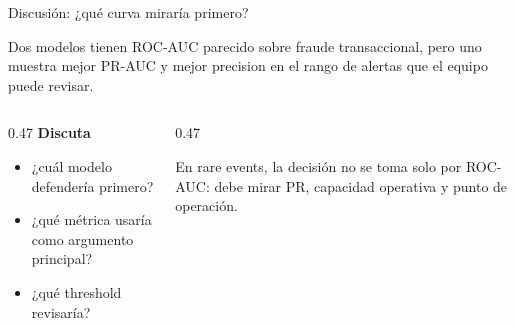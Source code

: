 \documentclass[aspectratio=169,12pt]{beamer}
\newcommand{\colhead}[1]{\textbf{#1}\par\vspace{2pt}}
\begin{document}

\begin{frame}{Discusión: ¿qué curva miraría primero?}
  \begin{taskbox}
    \small Dos modelos tienen ROC-AUC parecido sobre fraude transaccional, pero uno muestra mejor PR-AUC y mejor precision en el rango de alertas que el equipo puede revisar.
  \end{taskbox}
  \vspace{4pt}
  \begin{columns}[T]
    \begin{column}{0.47\textwidth}
      \colhead{Discuta}
      \begin{itemize}
        \item ¿cuál modelo defendería primero?
        \item ¿qué métrica usaría como argumento principal?
        \item ¿qué threshold revisaría?
      \end{itemize}
    \end{column}
    \begin{column}{0.47\textwidth}
      \begin{keybox}
        \small En rare events, la decisión no se toma solo por ROC-AUC: debe mirar PR, capacidad operativa y punto de operación.
      \end{keybox}
    \end{column}
  \end{columns}
\end{frame}
\end{document}
